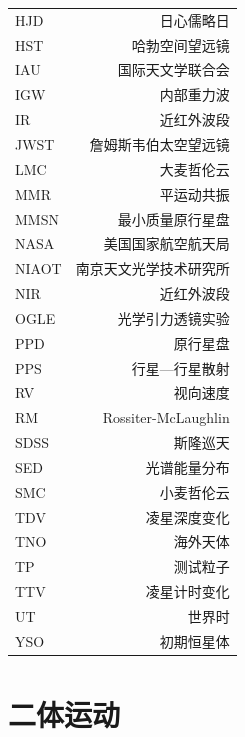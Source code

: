 \begin{multicols}{2}
\begin{tabularx}{0.85\linewidth}{@{\extracolsep{\fill}}lr}
\centering
HJD			&   日心儒略日				\\
HST			&   哈勃空间望远镜			\\
IAU			&   国际天文学联合会		\\
IGW			&   内部重力波				\\
IR			&   近红外波段				\\
JWST		&   詹姆斯韦伯太空望远镜		\\
LMC			&   大麦哲伦云				\\
MMR		&   平运动共振				\\   
MMSN		&   最小质量原行星盘		\\
NASA		&   美国国家航空航天局		\\
NIAOT		&   南京天文光学技术研究所	\\
NIR			&   近红外波段				\\
OGLE		&   光学引力透镜实验		\\
PPD			&   原行星盘				\\
PPS			&   行星---行星散射			\\
RV			&   视向速度				\\
RM 			&   Rossiter-McLaughlin 		\\
SDSS		&   斯隆巡天				\\
SED			&   光谱能量分布			\\
SMC			&   小麦哲伦云				\\
TDV			&   凌星深度变化			\\
TNO			&   海外天体				\\
TP			&   测试粒子				\\
TTV			&   凌星计时变化			\\
UT			&   世界时					\\
YSO			&   初期恒星体				
\end{tabularx}
\end{multicols}


\chapter{二体运动} \label{apdx:twobodyproblem}

